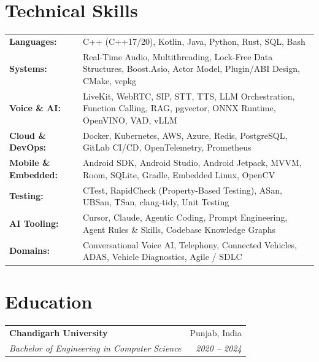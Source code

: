 \documentclass[letterpaper,10pt]{article}
\makeatletter
\newcommand{\resumeEntry}[4]{
  \vspace{2pt}
  \begin{tabularx}{\textwidth}{@{}X r@{}}
    \textbf{#1} & #2 \\
    \textit{#3} & \textit{#4} \\
  \end{tabularx}
  \vspace{-6pt}
}
\makeatother
\begin{document}
\section{Technical Skills}
\small
\begin{tabularx}{\textwidth}{@{}>{\raggedright\arraybackslash}p{1.45in} X@{}}
  \textbf{Languages:}       & C++ (C++17/20), Kotlin, Java, Python, Rust, SQL, Bash \\
  \textbf{Systems:}         & Real-Time Audio, Multithreading, Lock-Free Data Structures, Boost.Asio,
                              Actor Model, Plugin/ABI Design, CMake, vcpkg \\
  \textbf{Voice \& AI:}     & LiveKit, WebRTC, SIP, STT, TTS, LLM Orchestration, Function Calling, RAG,
                              pgvector, ONNX Runtime, OpenVINO, VAD, vLLM \\
  \textbf{Cloud \& DevOps:} & Docker, Kubernetes, AWS, Azure, Redis, PostgreSQL, GitLab CI/CD,
                              OpenTelemetry, Prometheus \\
  \textbf{Mobile \& Embedded:} & Android SDK, Android Studio, Android Jetpack, MVVM, Room, SQLite, Gradle,
                              Embedded Linux, OpenCV \\
  \textbf{Testing:}         & CTest, RapidCheck (Property-Based Testing), ASan, UBSan, TSan,
                              clang-tidy, Unit Testing \\
  \textbf{AI Tooling:}      & Cursor, Claude, Agentic Coding, Prompt Engineering, Agent Rules \& Skills,
                              Codebase Knowledge Graphs \\
  \textbf{Domains:}         & Conversational Voice AI, Telephony, Connected Vehicles, ADAS, Vehicle Diagnostics,
                              Agile / SDLC \\
\end{tabularx}

\section{Education}
\resumeEntry{Chandigarh University}{Punjab, India}
  {Bachelor of Engineering in Computer Science}{2020 -- 2024}
\end{document}
